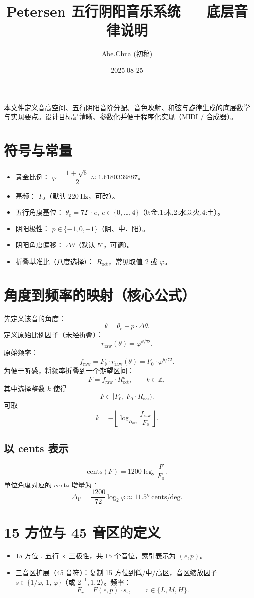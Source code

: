 \documentclass{article}
\title{Petersen 五行阴阳音乐系统 — 底层音律说明}
\author{Abe.Chua (初稿)}
\date{2025-08-25}
\begin{document}
\maketitle

本文件定义音高空间、五行阴阳音阶分配、音色映射、和弦与旋律生成的底层数学与实现要点。设计目标是清晰、参数化并便于程序化实现（MIDI / 合成器）。

\section{符号与常量}
\begin{itemize}
  \item 黄金比例： $\varphi=\dfrac{1+\sqrt{5}}{2}\approx1.6180339887$。
  \item 基频： $F_0$（默认 $220\ \mathrm{Hz}$，可改）。
  \item 五行角度基位： $\theta_e=72^\circ\cdot e,\ e\in\{0,\dots,4\}$（0:金,1:木,2:水,3:火,4:土）。
  \item 阴阳极性： $p\in\{-1,0,+1\}$（阴、中、阳）。
  \item 阴阳角度偏移： $\Delta\theta$（默认 $5^\circ$，可调）。
  \item 折叠基准比（八度选择）： $R_{\mathrm{oct}}$，常见取值 $2$ 或 $\varphi$。
\end{itemize}

\section{角度到频率的映射（核心公式）}
先定义该音的角度：
\[
\theta = \theta_e + p\cdot\Delta\theta .
\]
定义原始比例因子（未经折叠）：
\[
r_{\mathrm{raw}}(\theta)=\varphi^{\theta/72}.
\]
原始频率：
\[
f_{\mathrm{raw}} = F_{0}\cdot r_{\mathrm{raw}}(\theta) = F_{0}\cdot \varphi^{\theta/72}.
\]
为便于听感，将频率折叠到一个期望区间：
\[
F = f_{\mathrm{raw}}\cdot R_{\mathrm{oct}}^{k},\qquad k\in\mathbb{Z},
\]
其中选择整数 $k$ 使得
\[
F\in [F_{0},\ F_{0}\cdot R_{\mathrm{oct}}).
\]
可取
\[
k = -\left\lfloor \log_{R_{\mathrm{oct}}}\dfrac{f_{\mathrm{raw}}}{F_{0}} \right\rfloor.
\]

\subsection{以 cents 表示}
\[
\mathrm{cents}(F) = 1200\log_2\frac{F}{F_0}.
\]
单位角度对应的 cents 增量为：
\[
\Delta_{\text{1}^\circ} = \frac{1200}{72}\log_2\varphi \approx 11.57\ \text{cents/deg}.
\]

\section{15 方位与 45 音区的定义}
\begin{itemize}
  \item 15 方位：五行 $\times$ 三极性，共 15 个音位，索引表示为 $(e,p)$。
  \item 三音区扩展（45 音符）：复制 15 方位到低/中/高区，音区缩放因子 $s\in\{1/\varphi,\,1,\,\varphi\}$（或 $2^{-1},1,2$）。频率：
  \[
  F_{r} = F(e,p)\cdot s_r,\qquad r\in\{L,M,H\}.
  \]
\end{itemize}
\end{document}
